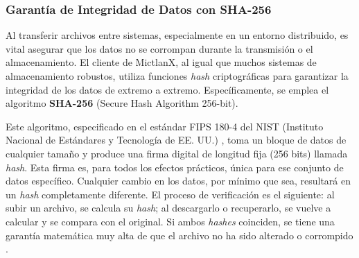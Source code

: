 \subsubsection{Garantía de Integridad de Datos con SHA-256}
Al transferir archivos entre sistemas, especialmente en un entorno distribuido, es vital asegurar que los datos no se corrompan durante la transmisión o el almacenamiento. El cliente de MictlanX, al igual que muchos sistemas de almacenamiento robustos, utiliza funciones \textit{hash} criptográficas para garantizar la integridad de los datos de extremo a extremo. Específicamente, se emplea el algoritmo \textbf{SHA-256} (Secure Hash Algorithm 256-bit).
\par
Este algoritmo, especificado en el estándar FIPS 180-4 del NIST (Instituto Nacional de Estándares y Tecnología de EE. UU.) \cite{nist2015fips180}, toma un bloque de datos de cualquier tamaño y produce una firma digital de longitud fija (256 bits) llamada \textit{hash}. Esta firma es, para todos los efectos prácticos, única para ese conjunto de datos específico. Cualquier cambio en los datos, por mínimo que sea, resultará en un \textit{hash} completamente diferente. El proceso de verificación es el siguiente: al subir un archivo, se calcula su \textit{hash}; al descargarlo o recuperarlo, se vuelve a calcular y se compara con el original. Si ambos \textit{hashes} coinciden, se tiene una garantía matemática muy alta de que el archivo no ha sido alterado o corrompido \cite{stallings2017cryptography}.